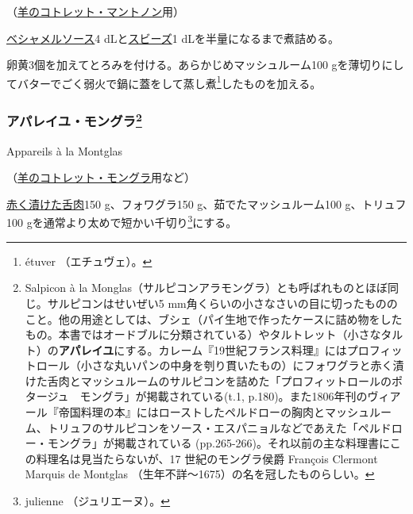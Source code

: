 \begin{recette}
（\protect\hyperlink{cotelettes-maintenon}{羊のコトレット・マントノン}用）

\protect\hyperlink{sauce-bechamel}{ベシャメルソース}4
dLと\protect\hyperlink{sauce-soubise}{スビーズ}1
dLを半量になるまで煮詰める。

卵黄3個を加えてとろみを付ける。あらかじめマッシュルーム100
gを薄切りにしてバターでごく弱火で鍋に蓋をして蒸し煮\footnote{étuver
  （エチュヴェ）。}したものを加える。

\atoaki{}

\hypertarget{appareil-montglas}{%
\subsubsection[アパレイユ・モングラ]{\texorpdfstring{アパレイユ・モングラ\footnote{Salpicon
  à la
  Monglas（サルピコンアラモングラ）とも呼ばれものとほぼ同じ。サルピコンはせいぜい5
  mm角くらいの小さなさいの目に切ったもののこと。他の用途としては、ブシェ（パイ生地で作ったケースに詰め物をしたもの。本書ではオードブルに分類されている）やタルトレット（小さなタルト）の\textbf{アパレイユ}にする。カレーム『19世紀フランス料理』にはプロフィットロール（小さな丸いパンの中身を刳り貫いたもの）にフォワグラと赤く漬けた舌肉とマッシュルームのサルピコンを詰めた「プロフィットロールのポタージュ　モングラ」が掲載されている(t.1,
  p.180)。また1806年刊のヴィアール『帝国料理の本』にはローストしたペルドローの胸肉とマッシュルーム、トリュフのサルピコンをソース・エスパニョルなどであえた「ペルドロー・モングラ」が掲載されている
  (pp.265-266)。それ以前の主な料理書にこの料理名は見当たらないが、17
  世紀のモングラ侯爵 François Clermont Marquis de Montglas
  （生年不詳〜1675）の名を冠したものらしい。}}{アパレイユ・モングラ}}\label{appareil-montglas}}

\begin{frsubenv}

Appareils à la Montglas

\end{frsubenv}


（\protect\hyperlink{cotelettes-monglas}{羊のコトレット・モングラ}用など）

\protect\hyperlink{saumure-liquide-pour-langues}{赤く漬けた舌肉}150
g、フォワグラ150 g、茹でたマッシュルーム100 g、トリュフ100
gを通常より太めで短かい千切り\footnote{julienne （ジュリエーヌ）。}にする。


\end{recette}
